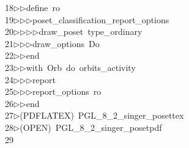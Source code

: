 \begin{tabbing}
18\>$\triangleright$\>$\triangleright$\>define\ ro\ \\[0pt]
19\>$\triangleright$\>$\triangleright$\>$\triangleright$\>poset\_classification\_report\_options\ \\[0pt]
20\>$\triangleright$\>$\triangleright$\>$\triangleright$\>$\triangleright$\>draw\_poset\ type\_ordinary\ \\[0pt]
21\>$\triangleright$\>$\triangleright$\>$\triangleright$\>draw\_options\ Do\ \\[0pt]
22\>$\triangleright$\>$\triangleright$\>end\ \\[0pt]
23\>$\triangleright$\>$\triangleright$\>with\ Orb\ do\ orbits\_activity\ \\[0pt]
24\>$\triangleright$\>$\triangleright$\>$\triangleright$\>report\ \ \\[0pt]
25\>$\triangleright$\>$\triangleright$\>$\triangleright$\>report\_options\ ro\ \\[0pt]
26\>$\triangleright$\>$\triangleright$\>end\ \\[0pt]
27\>$\triangleright$\>(PDFLATEX)\ PGL\_8\_2\_singer\_posettex\\[0pt]
28\>$\triangleright$\>(OPEN)\ PGL\_8\_2\_singer\_posetpdf\\[0pt]
29\>\end{tabbing}
